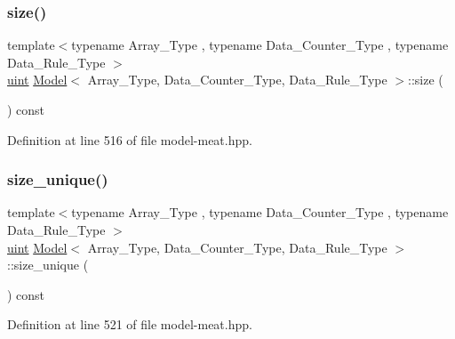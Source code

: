 \mbox{\label{class_model_ab3f157dbb542a48fe5bf412ff7d467fd}} 
\subsubsection{\texorpdfstring{size()}{size()}}
{\footnotesize\ttfamily template$<$typename Array\+\_\+\+Type , typename Data\+\_\+\+Counter\+\_\+\+Type , typename Data\+\_\+\+Rule\+\_\+\+Type $>$ \\
\hyperlink{typedefs_8hpp_a91ad9478d81a7aaf2593e8d9c3d06a14}{uint} \hyperlink{class_model}{Model}$<$ Array\+\_\+\+Type, Data\+\_\+\+Counter\+\_\+\+Type, Data\+\_\+\+Rule\+\_\+\+Type $>$\+::size (\begin{DoxyParamCaption}{ }\end{DoxyParamCaption}) const\hspace{0.3cm}{\ttfamily [inline]}}



Definition at line 516 of file model-\/meat.\+hpp.

\mbox{\label{class_model_a4b5edbe891b6da2319ea3fa6f1aba11d}} 
\subsubsection{\texorpdfstring{size\+\_\+unique()}{size\_unique()}}
{\footnotesize\ttfamily template$<$typename Array\+\_\+\+Type , typename Data\+\_\+\+Counter\+\_\+\+Type , typename Data\+\_\+\+Rule\+\_\+\+Type $>$ \\
\hyperlink{typedefs_8hpp_a91ad9478d81a7aaf2593e8d9c3d06a14}{uint} \hyperlink{class_model}{Model}$<$ Array\+\_\+\+Type, Data\+\_\+\+Counter\+\_\+\+Type, Data\+\_\+\+Rule\+\_\+\+Type $>$\+::size\+\_\+unique (\begin{DoxyParamCaption}{ }\end{DoxyParamCaption}) const\hspace{0.3cm}{\ttfamily [inline]}}



Definition at line 521 of file model-\/meat.\+hpp.

\mbox{\label{class_model_a06a6f52dfc6868908cf11e6663a93904}} 
